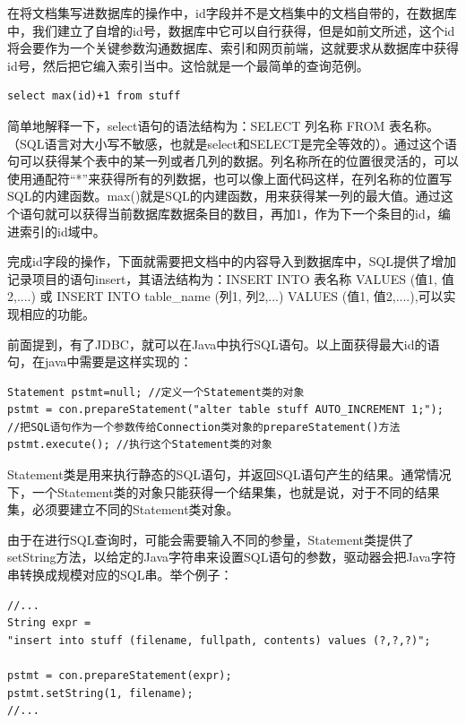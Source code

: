 \documentclass[12pt,a4paper]{article}
\begin{document}
	在将文档集写进数据库的操作中，id字段并不是文档集中的文档自带的，在数据库中，我们建立了自增的id号，数据库中它可以自行获得，但是如前文所述，这个id将会要作为一个关键参数沟通数据库、索引和网页前端，这就要求从数据库中获得id号，然后把它编入索引当中。这恰就是一个最简单的查询范例。
	
	\lstset{language=SQL,frame=lines}
	\begin{lstlisting}
select max(id)+1 from stuff
	\end{lstlisting}	
	
	简单地解释一下，select语句的语法结构为：SELECT 列名称 FROM 表名称。（SQL语言对大小写不敏感，也就是select和SELECT是完全等效的）。通过这个语句可以获得某个表中的某一列或者几列的数据。列名称所在的位置很灵活的，可以使用通配符“*”来获得所有的列数据，也可以像上面代码这样，在列名称的位置写SQL的内建函数。max()就是SQL的内建函数，用来获得某一列的最大值。通过这个语句就可以获得当前数据库数据条目的数目，再加1，作为下一个条目的id，编进索引的id域中。
	
	完成id字段的操作，下面就需要把文档中的内容导入到数据库中，SQL提供了增加记录项目的语句insert，其语法结构为：INSERT INTO 表名称 VALUES (值1, 值2,....)	或 INSERT INTO table\_{}name (列1, 列2,...) VALUES (值1, 值2,....),可以实现相应的功能。
	
	前面提到，有了JDBC，就可以在Java中执行SQL语句。以上面获得最大id的语句，在java中需要是这样实现的：
	\lstset{language=Java,frame=lines}
	\begin{lstlisting}
Statement pstmt=null; //定义一个Statement类的对象
pstmt = con.prepareStatement("alter table stuff AUTO_INCREMENT 1;");
//把SQL语句作为一个参数传给Connection类对象的prepareStatement()方法
pstmt.execute(); //执行这个Statement类的对象
	\end{lstlisting}	
	
	Statement类是用来执行静态的SQL语句，并返回SQL语句产生的结果。通常情况下，一个Statement类的对象只能获得一个结果集，也就是说，对于不同的结果集，必须要建立不同的Statement类对象。
	
	由于在进行SQL查询时，可能会需要输入不同的参量，Statement类提供了setString方法，以给定的Java字符串来设置SQL语句的参数，驱动器会把Java字符串转换成规模对应的SQL串。举个例子：
		\lstset{language=Java,frame=lines}
	\begin{lstlisting}
//...
String expr =
"insert into stuff (filename, fullpath, contents) values (?,?,?)";

pstmt = con.prepareStatement(expr);
pstmt.setString(1, filename);
//...
	\end{lstlisting}	
	
\end{document}
